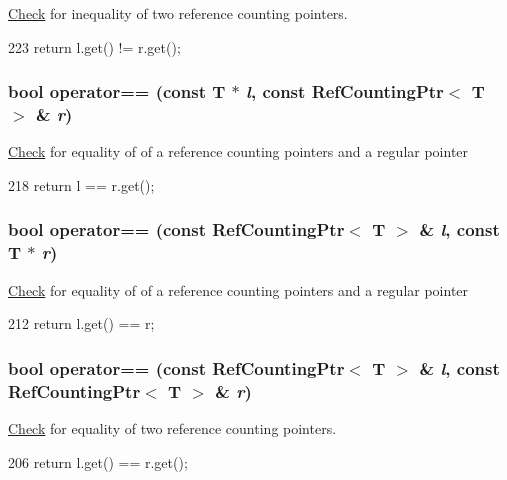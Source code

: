 \hyperlink{classCheck}{Check} for inequality of two reference counting pointers. 


\begin{DoxyCode}
223 { return l.get() != r.get(); }
\end{DoxyCode}
\hypertarget{refcnt_8hh_a2060a16b61b6e20f45bdaf8ad44ae29d}{
\subsubsection[{operator==}]{\setlength{\rightskip}{0pt plus 5cm}bool operator== (const T $\ast$ {\em l}, \/  const {\bf RefCountingPtr}$<$ T $>$ \& {\em r})}}
\label{refcnt_8hh_a2060a16b61b6e20f45bdaf8ad44ae29d}
\hyperlink{classCheck}{Check} for equality of of a reference counting pointers and a regular pointer 


\begin{DoxyCode}
218 { return l == r.get(); }
\end{DoxyCode}
\hypertarget{refcnt_8hh_a3d72905499b41a69da9fbeca4d406508}{
\subsubsection[{operator==}]{\setlength{\rightskip}{0pt plus 5cm}bool operator== (const {\bf RefCountingPtr}$<$ T $>$ \& {\em l}, \/  const T $\ast$ {\em r})}}
\label{refcnt_8hh_a3d72905499b41a69da9fbeca4d406508}
\hyperlink{classCheck}{Check} for equality of of a reference counting pointers and a regular pointer 


\begin{DoxyCode}
212 { return l.get() == r; }
\end{DoxyCode}
\hypertarget{refcnt_8hh_a80f756a089fa7f637c365317498d9126}{
\subsubsection[{operator==}]{\setlength{\rightskip}{0pt plus 5cm}bool operator== (const {\bf RefCountingPtr}$<$ T $>$ \& {\em l}, \/  const {\bf RefCountingPtr}$<$ T $>$ \& {\em r})}}
\label{refcnt_8hh_a80f756a089fa7f637c365317498d9126}


\hyperlink{classCheck}{Check} for equality of two reference counting pointers. 


\begin{DoxyCode}
206 { return l.get() == r.get(); }
\end{DoxyCode}
